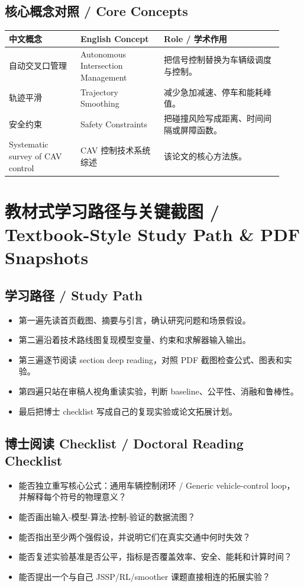 \documentclass[UTF8,a4paper,11pt,fontset=fandol]{ctexart}
\begin{document}
\subsection{核心概念对照 / Core Concepts}
\begin{longtable}{p{0.24\linewidth}p{0.28\linewidth}p{0.40\linewidth}}
\toprule
中文概念 & English Concept & Role / 学术作用\\
\midrule
自动交叉口管理 & Autonomous Intersection Management & 把信号控制替换为车辆级调度与控制。 \\
轨迹平滑 & Trajectory Smoothing & 减少急加减速、停车和能耗峰值。 \\
安全约束 & Safety Constraints & 把碰撞风险写成距离、时间间隔或屏障函数。 \\
Systematic survey of CAV control & CAV 控制技术系统综述 & 该论文的核心方法族。 \\
\bottomrule
\end{longtable}

\section{教材式学习路径与关键截图 / Textbook-Style Study Path \& PDF Snapshots}
\subsection{学习路径 / Study Path}
\begin{itemize}
\item 第一遍先读首页截图、摘要与引言，确认研究问题和场景假设。
\item 第二遍沿着技术路线图复现模型变量、约束和求解器输入输出。
\item 第三遍逐节阅读 section deep reading，对照 PDF 截图检查公式、图表和实验。
\item 第四遍只站在审稿人视角重读实验，判断 baseline、公平性、消融和鲁棒性。
\item 最后把博士 checklist 写成自己的复现实验或论文拓展计划。
\end{itemize}


\subsection{博士阅读 Checklist / Doctoral Reading Checklist}
\begin{itemize}
\item 能否独立重写核心公式：通用车辆控制闭环 / Generic vehicle-control loop，并解释每个符号的物理意义？
\item 能否画出输入-模型-算法-控制-验证的数据流图？
\item 能否指出至少两个强假设，并说明它们在真实交通中何时失效？
\item 能否复述实验基准是否公平，指标是否覆盖效率、安全、能耗和计算时间？
\item 能否提出一个与自己 JSSP/RL/smoother 课题直接相连的拓展实验？
\end{itemize}
\end{document}
